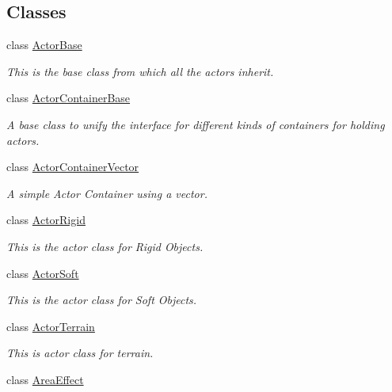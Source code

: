 \subsection*{Classes}
\begin{DoxyCompactItemize}
\item 
class \hyperlink{classphys_1_1ActorBase}{ActorBase}
\begin{DoxyCompactList}\small\item\em This is the base class from which all the actors inherit. \item\end{DoxyCompactList}\item 
class \hyperlink{classphys_1_1ActorContainerBase}{ActorContainerBase}
\begin{DoxyCompactList}\small\item\em A base class to unify the interface for different kinds of containers for holding actors. \item\end{DoxyCompactList}\item 
class \hyperlink{classphys_1_1ActorContainerVector}{ActorContainerVector}
\begin{DoxyCompactList}\small\item\em A simple Actor Container using a vector. \item\end{DoxyCompactList}\item 
class \hyperlink{classphys_1_1ActorRigid}{ActorRigid}
\begin{DoxyCompactList}\small\item\em This is the actor class for Rigid Objects. \item\end{DoxyCompactList}\item 
class \hyperlink{classphys_1_1ActorSoft}{ActorSoft}
\begin{DoxyCompactList}\small\item\em This is the actor class for Soft Objects. \item\end{DoxyCompactList}\item 
class \hyperlink{classphys_1_1ActorTerrain}{ActorTerrain}
\begin{DoxyCompactList}\small\item\em This is actor class for terrain. \item\end{DoxyCompactList}\item 
class \hyperlink{classphys_1_1AreaEffect}{AreaEffect}

\end{DoxyCompactItemize}
